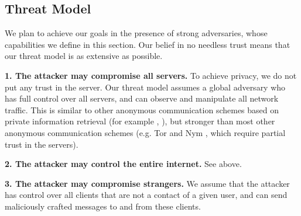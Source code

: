 \subsection{Threat Model}
\label{subsec:threatmodel}


We plan to achieve our goals in the presence of strong adversaries, whose capabilities we define in this section. Our belief in no needless trust means that our threat model is as extensive as possible.




\textbf{1. The attacker may compromise all servers.} To achieve privacy, we do not put any trust in the server. Our threat model assumes a global adversary who has full control over all servers, and can observe and manipulate all network traffic. This is similar to other anonymous communication schemes based on private information retrieval (for example \cite{ahmad2021addra}, ), but stronger than most other anonymous communication schemes (e.g. Tor \cite{dingledine2004tor} and Nym \cite{piotrowska2017loopix}, which require partial trust in the servers).

\textbf{2. The attacker may control the entire internet.} See above.

\textbf{3. The attacker may compromise strangers.} We assume that the attacker has control over all clients that are not a contact of a given user, and can send maliciously crafted messages to and from these clients.

